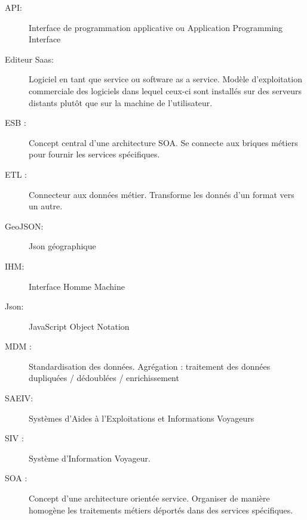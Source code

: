 \documentclass[a4paper]{report}
\begin{document}
\begin{description}
	\item[API:] Interface de programmation applicative ou Application Programming Interface
	\item[Editeur Saas:] Logiciel en tant que service ou software as a service. Modèle d'exploitation commerciale des logiciels dans lequel ceux-ci sont installés sur des serveurs distants plutôt que sur la machine de l'utilisateur.
	\item[ESB :] Concept central d'une architecture SOA. Se connecte aux briques métiers pour fournir les services spécifiques.
	\item[ETL :] Connecteur aux données métier. Transforme les donnés d'un format vers un autre.
	\item[GeoJSON:] Json géographique
	\item[IHM: ] Interface Homme Machine
	\item[Json:] JavaScript Object Notation
	\item[MDM :] Standardisation des données. Agrégation : traitement des données dupliquées / dédoublées / enrichissement
	\item[SAEIV:] Systèmes d'Aides à l'Exploitations et Informations Voyageurs 
	\item[SIV :] Système d'Information Voyageur.
	\item[SOA :] Concept d'une architecture orientée service. Organiser de manière homogène les traitements métiers déportés dans des services spécifiques.
\end{description} 

\appendix
\listoffigures
{}


\end{document}

